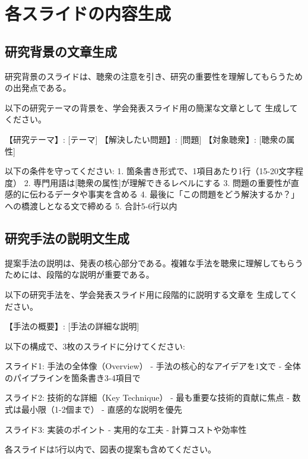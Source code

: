 \section{各スライドの内容生成}
\label{sec:5.3}

\subsection{研究背景の文章生成}

研究背景のスライドは、聴衆の注意を引き、研究の重要性を理解してもらうための出発点である。

\begin{promptbox}
以下の研究テーマの背景を、学会発表スライド用の簡潔な文章として
生成してください。

【研究テーマ】: [テーマ]
【解決したい問題】: [問題]
【対象聴衆】: [聴衆の属性]

以下の条件を守ってください:
1. 箇条書き形式で、1項目あたり1行（15-20文字程度）
2. 専門用語は[聴衆の属性]が理解できるレベルにする
3. 問題の重要性が直感的に伝わるデータや事実を含める
4. 最後に「この問題をどう解決するか？」への橋渡しとなる文で締める
5. 合計5-6行以内
\end{promptbox}

\subsection{研究手法の説明文生成}

提案手法の説明は、発表の核心部分である。複雑な手法を聴衆に理解してもらうためには、段階的な説明が重要である。

\begin{promptbox}
以下の研究手法を、学会発表スライド用に段階的に説明する文章を
生成してください。

【手法の概要】: [手法の詳細な説明]

以下の構成で、3枚のスライドに分けてください:

スライド1: 手法の全体像（Overview）
- 手法の核心的なアイデアを1文で
- 全体のパイプラインを箇条書き3-4項目で

スライド2: 技術的な詳細（Key Technique）
- 最も重要な技術的貢献に焦点
- 数式は最小限（1-2個まで）
- 直感的な説明を優先

スライド3: 実装のポイント
- 実用的な工夫
- 計算コストや効率性

各スライドは5行以内で、図表の提案も含めてください。
\end{promptbox}

